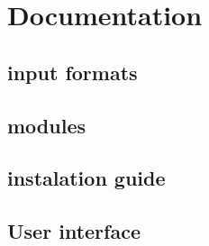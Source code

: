\chapter{Documentation}

\section{input formats}

\section{modules}

\section{instalation guide}

\section{User interface}

